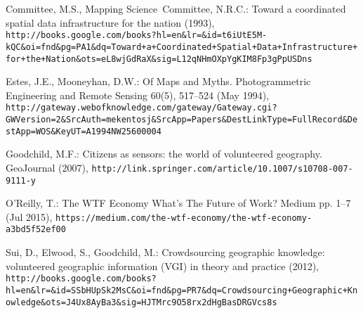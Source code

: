 \documentclass{llncs}
\begin{document}
\begin{thebibliography}{1}
\providecommand{\url}[1]{\texttt{#1}}
\providecommand{\urlprefix}{URL }

Committee, M.S., Mapping Science~Committee, N.R.C.: {Toward a coordinated
  spatial data infrastructure for the nation} (1993),
  \url{http://books.google.com/books?hl=en&lr=&id=t6iUtE5M-kQC&oi=fnd&pg=PA1&dq=Toward+a+Coordinated+Spatial+Data+Infrastructure+for+the+Nation&ots=eL8wjGdRaX&sig=L12qNHmOXpYgKIM8Fp3gPpUSDns}

Estes, J.E., Mooneyhan, D.W.: {Of Maps and Myths}. Photogrammetric Engineering
  and Remote Sensing  60(5),  517--524 (May 1994),
  \url{http://gateway.webofknowledge.com/gateway/Gateway.cgi?GWVersion=2&SrcAuth=mekentosj&SrcApp=Papers&DestLinkType=FullRecord&DestApp=WOS&KeyUT=A1994NW25600004}

Goodchild, M.F.: {Citizens as sensors: the world of volunteered geography}.
  GeoJournal  (2007),
  \url{http://link.springer.com/article/10.1007/s10708-007-9111-y}

O'Reilly, T.: {The WTF Economy {\textemdash} What{\textquoteright}s The Future
  of Work? {\textemdash} Medium} pp. 1--7 (Jul 2015),
  \url{https://medium.com/the-wtf-economy/the-wtf-economy-a3bd5f52ef00}

Sui, D., Elwood, S., Goodchild, M.: {Crowdsourcing geographic knowledge:
  volunteered geographic information (VGI) in theory and practice} (2012),
  \url{http://books.google.com/books?hl=en&lr=&id=SSbHUpSk2MsC&oi=fnd&pg=PR7&dq=Crowdsourcing+Geographic+Knowledge&ots=J4Ux8AyBa3&sig=HJTMrc9O58rx2dHgBasDRGVcs8s}

\end{thebibliography}
\end{document}
